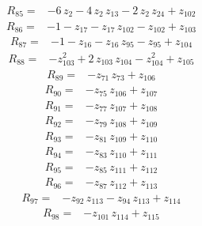 \documentclass[10pt]{article}
\begin{document}
\begin{align*}
R_{85}={}& - 6\,z_{2} - 4\,z_{2}\,z_{13} - 2\,z_{2}\,z_{24} + z_{102}
\end{align*}
\begin{align*}
R_{86}={}& - 1 - z_{17} - z_{17}\,z_{102} - z_{102} + z_{103}
\end{align*}
\begin{align*}
R_{87}={}& - 1 - z_{16} - z_{16}\,z_{95} - z_{95} + z_{104}
\end{align*}
\begin{align*}
R_{88}={}& - z_{103}^{2} + 2\,z_{103}\,z_{104} - z_{104}^{2} + z_{105}
\end{align*}
\begin{align*}
R_{89}={}& - z_{71}\,z_{73} + z_{106}
\end{align*}
\begin{align*}
R_{90}={}& - z_{75}\,z_{106} + z_{107}
\end{align*}
\begin{align*}
R_{91}={}& - z_{77}\,z_{107} + z_{108}
\end{align*}
\begin{align*}
R_{92}={}& - z_{79}\,z_{108} + z_{109}
\end{align*}
\begin{align*}
R_{93}={}& - z_{81}\,z_{109} + z_{110}
\end{align*}
\begin{align*}
R_{94}={}& - z_{83}\,z_{110} + z_{111}
\end{align*}
\begin{align*}
R_{95}={}& - z_{85}\,z_{111} + z_{112}
\end{align*}
\begin{align*}
R_{96}={}& - z_{87}\,z_{112} + z_{113}
\end{align*}
\begin{align*}
R_{97}={}& - z_{92}\,z_{113} - z_{94}\,z_{113} + z_{114}
\end{align*}
\begin{align*}
R_{98}={}& - z_{101}\,z_{114} + z_{115}
\end{align*}
\end{document}
